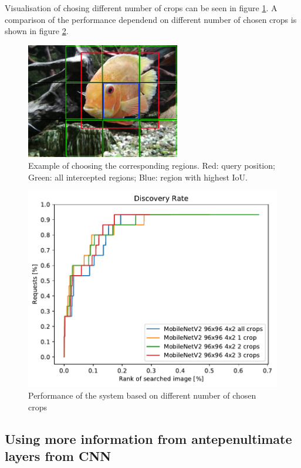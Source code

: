 Visualisation of chosing different number of crops can be seen in figure \ref{fig:fish_with_grid}. A comparison of the performance dependend on different number of chosen crops is shown in figure \ref{fig:crop_limitation}.

\begin{figure}
\centering
\includegraphics[width=0.6\textwidth]{img/fish_grid_regions}
\caption{Example of choosing the corresponding regions. Red: query position; Green: all intercepted regions; Blue: region with highest IoU.}
\label{fig:fish_with_grid}
\end{figure}


\begin{figure}
\centering
\includegraphics[width=\textwidth]{graphs/c2cf4e147040018e6cfc46043bb59de4f5f3e83441c1e1024af0b7bab644a994}
\caption{Performance of the system based on different number of chosen crops}
\label{fig:crop_limitation}
\end{figure}


\subsection{Using more information from antepenultimate layers from CNN}

